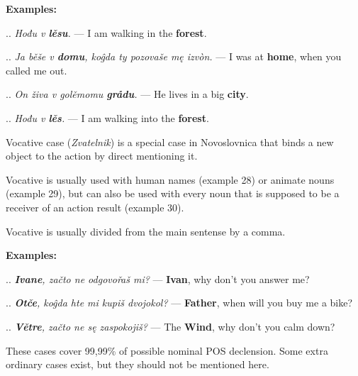 \textbf{Examples:}

.. \textit{Hođu v \textbf{lěsu}.} — I am walking in the \textbf{forest}.

.. \textit{Ja běše v \textbf{domu}, koĝda ty pozovaše mę izvòn.} — I was at \textbf{home}, when you called me out.

.. \textit{On živa v golěmomu \textbf{grådu}.} — He lives in a big \textbf{city}.

.. \textit{Hođu v \textbf{lěs}.} — I am walking into the \textbf{forest}.

Vocative case (\textit{Zvatelnik}) is a special case in Novoslovnica that binds a new object to the action by direct mentioning it.

Vocative is usually used with human names (example 28) or animate nouns (example 29), but can also be used with every noun that is supposed to be a receiver of an action result (example 30).

Vocative is usually divided from the main sentense by a comma.

\textbf{Examples:}

.. \textit{\textbf{Ivane}, začto ne odgovořaš mi?} — \textbf{Ivan}, why don't you answer me?

.. \textit{\textbf{Otče}, koĝda hte mi kupiš dvojokol?} — \textbf{Father}, when will you buy me a bike?

.. \textit{\textbf{Větre}, začto ne sę zaspokojiš?} — The \textbf{Wind}, why don't you calm down?

These cases cover 99,99\% of possible nominal POS declension. Some extra ordinary cases exist, but they should not be mentioned here.
